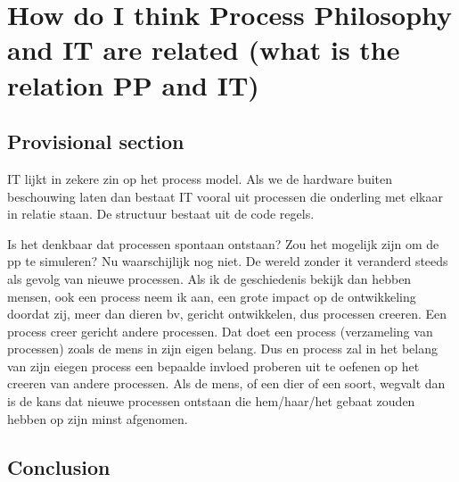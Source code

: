 \chapter{How do I think Process Philosophy and IT are related (what is the relation PP and IT)}
\section{Provisional section}



IT lijkt in zekere zin op het process model. Als we de hardware buiten beschouwing laten dan bestaat IT vooral uit processen die onderling met elkaar in relatie staan. De structuur bestaat uit de code regels.

Is het denkbaar dat processen spontaan ontstaan? Zou het mogelijk zijn om de pp te simuleren?
Nu waarschijlijk nog niet.
De wereld zonder it veranderd steeds als gevolg van nieuwe processen.
 Als ik de geschiedenis bekijk dan hebben mensen, ook een process neem ik aan, een grote impact op de ontwikkeling doordat zij, meer dan dieren bv, gericht ontwikkelen, dus processen creeren. Een process creer gericht andere processen.
Dat doet een process (verzameling van processen) zoals de mens in zijn eigen belang. Dus en process zal in het belang van zijn eiegen process een bepaalde invloed proberen uit te oefenen op het creeren van andere processen. Als de mens, of een dier of een soort, wegvalt dan is de kans dat nieuwe processen ontstaan die hem/haar/het gebaat zouden hebben op zijn minst afgenomen.


\section{Conclusion}


